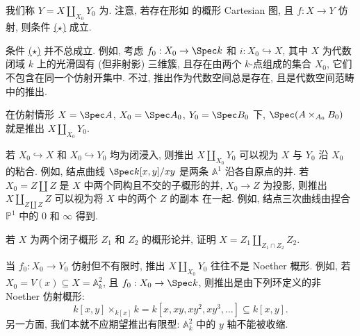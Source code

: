 我们称 $Y=X\amalg_{X_0}Y_0$ 为. 注意, 若存在形如  的概形 Cartesian 图, 且 $f:X\to Y$ 仿射, 则条件 \hyperlink{pushout-affine-neighborhood}{($\star$)} 成立.
\begin{remark}[一般情形下推出的存在性]\label{src:B.4.3}
条件 \hyperlink{pushout-affine-neighborhood}{($\star$)} 并不总成立. 例如, 考虑 $f_0:X_0\to\Spec k$ 和 $i:X_0\hookrightarrow X$, 其中 $X$ 为代数闭域 $k$ 上的光滑固有 (但非射影) 三维簇, 且存在由两个 $k$-点组成的集合 $X_0$, 它们不包含在同一个仿射开集中. 不过, 推出作为代数空间总是存在, 且是代数空间范畴中的推出.
\end{remark}
\begin{example}[仿射情形]\label{src:B.4.4}
在仿射情形 $X=\Spec A$, $X_0=\Spec A_0$, $Y_0=\Spec B_0$ 下, $\Spec(A\times_{A_0}B_0)$ 就是推出 $X\amalg_{X_0}Y_0$.
\end{example}
\begin{example}[粘合与捏合]\label{src:B.4.5}
若 $X_0\hookrightarrow X$ 和 $X_0\hookrightarrow Y_0$ 均为闭浸入, 则推出 $X\amalg_{X_0}Y_0$ 可以视为 $X$ 与 $Y_0$ 沿 $X_0$ 的粘合. 例如, 结点曲线 $\Spec k[x,y]/xy$ 是两条 $\mathbb A^1$ 沿各自原点的并. 若 $X_0=Z\amalg Z$ 是 $X$ 中两个同构且不交的子概形的并, $X_0\to Z$ 为投影, 则推出 $X\amalg_{Z\amalg Z}Z$ 可以视为将 $X$ 中的两个 $Z$ 的副本 在一起. 例如, 结点三次曲线由捏合 $\mathbb P^1$ 中的 $0$ 和 $\infty$ 得到.
\end{example}
\begin{exercise}\label{src:B.4.6}
若 $X$ 为两个闭子概形 $Z_1$ 和 $Z_2$ 的概形论并, 证明 $X=Z_1\amalg_{Z_1\cap Z_2}Z_2$.
\end{exercise}
\newpage
\begin{example}[非 Noether 性]\label{src:B.4.7}
当 $f_0:X_0\to Y_0$ 仿射但不有限时, 推出 $X\amalg_{X_0}Y_0$ 往往不是 Noether 概形. 例如, 若 $X_0=V(x)\subseteq X=\mathbb A^2_k$, 且 $f_0:X_0\to\Spec k$, 则推出是由下列环定义的非 Noether 仿射概形:
\[
k[x,y]\times_{k[x]}k=k[x,xy,xy^2,xy^3,\ldots]\subseteq k[x,y].
\]
另一方面, 我们本就不应期望推出有限型: $\mathbb A^2_k$ 中的 $y$ 轴不能被收缩.
\end{example}

